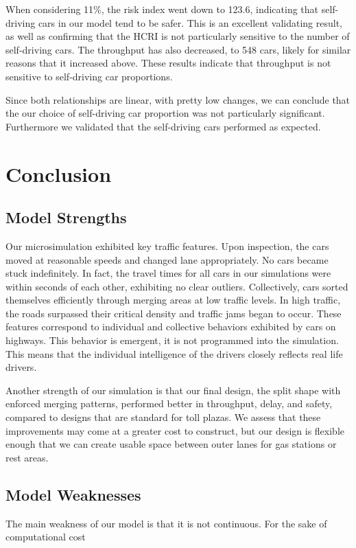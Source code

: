 \documentclass[a4paper, 11pt]{article}
\begin{document}
When considering 11\%, the risk index went down to 123.6, indicating that self-driving cars in our model tend to be safer. This is an excellent validating result, as well as confirming that the HCRI is not particularly sensitive to the number of self-driving cars. The throughput has also decreased, to 548 cars, likely for similar reasons that it increased above. %
These results indicate that throughput is not sensitive to self-driving car proportions.

Since both relationships are linear, with pretty low changes, we can conclude that the our choice of self-driving car proportion was not particularly significant. Furthermore we validated that the self-driving cars performed as expected.

\section{Conclusion}


\subsection{Model Strengths}
Our microsimulation exhibited key traffic features. Upon inspection, the cars moved at reasonable speeds and changed lane appropriately. No cars became stuck indefinitely. In fact, the travel times for all cars in our simulations were within seconds of each other, exhibiting no clear outliers. Collectively, cars sorted themselves efficiently through merging areas at low traffic levels. In high traffic, the roads surpassed their critical density and traffic jams began to occur. These features correspond to individual and collective behaviors exhibited by cars on highways. This behavior is emergent, it is not programmed into the simulation. This means that the individual intelligence of the drivers closely reflects real life drivers. 

Another strength of our simulation is that our final design, the split shape with enforced merging patterns, performed better in throughput, delay, and safety, compared to designs that are standard for toll plazas. We assess that these improvements may come at a greater cost to construct, but our design is flexible enough that we can create usable space between outer lanes for gas stations or rest areas. 

\subsection{Model Weaknesses}
The main weakness of our model is that it is not continuous. For the sake of computational cost
\end{document}
